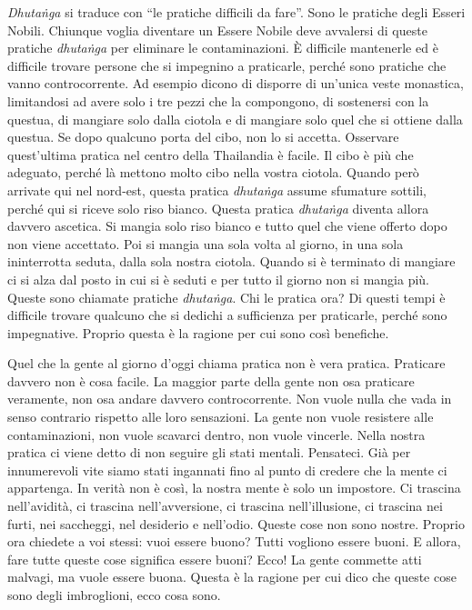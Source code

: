\emph{Dhutaṅga} si traduce con ``le pratiche difficili da fare''. Sono
le pratiche degli Esseri Nobili. Chiunque voglia diventare un Essere
Nobile deve avvalersi di queste pratiche \emph{dhutaṅga} per eliminare
le contaminazioni. È difficile mantenerle ed è difficile trovare persone
che si impegnino a praticarle, perché sono pratiche che vanno
controcorrente. Ad esempio dicono di disporre di un'unica veste
monastica, limitandosi ad avere solo i tre pezzi che la compongono, di
sostenersi con la questua, di mangiare solo dalla ciotola e di mangiare
solo quel che si ottiene dalla questua. Se dopo qualcuno porta del cibo,
non lo si accetta. Osservare quest'ultima pratica nel centro della
Thailandia è facile. Il cibo è più che adeguato, perché là mettono molto
cibo nella vostra ciotola. Quando però arrivate qui nel nord-est, questa
pratica \emph{dhutaṅga} assume sfumature sottili, perché qui si riceve
solo riso bianco. Questa pratica \emph{dhutaṅga} diventa allora davvero
ascetica. Si mangia solo riso bianco e tutto quel che viene offerto dopo
non viene accettato. Poi si mangia una sola volta al giorno, in una sola
ininterrotta seduta, dalla sola nostra ciotola. Quando si è terminato di
mangiare ci si alza dal posto in cui si è seduti e per tutto il giorno
non si mangia più. Queste sono chiamate pratiche \emph{dhutaṅga}. Chi le
pratica ora? Di questi tempi è difficile trovare qualcuno che si dedichi
a sufficienza per praticarle, perché sono impegnative. Proprio questa è
la ragione per cui sono così benefiche.

Quel che la gente al giorno d'oggi chiama pratica non è vera pratica.
Praticare davvero non è cosa facile. La maggior parte della gente non
osa praticare veramente, non osa andare davvero controcorrente. Non
vuole nulla che vada in senso contrario rispetto alle loro sensazioni.
La gente non vuole resistere alle contaminazioni, non vuole scavarci
dentro, non vuole vincerle. Nella nostra pratica ci viene detto di non
seguire gli stati mentali. Pensateci. Già per innumerevoli vite siamo
stati ingannati fino al punto di credere che la mente ci appartenga. In
verità non è così, la nostra mente è solo un impostore. Ci trascina
nell'avidità, ci trascina nell'avversione, ci trascina nell'illusione,
ci trascina nei furti, nei saccheggi, nel desiderio e nell'odio. Queste
cose non sono nostre. Proprio ora chiedete a voi stessi: vuoi essere
buono? Tutti vogliono essere buoni. E allora, fare tutte queste cose
significa essere buoni? Ecco! La gente commette atti malvagi, ma vuole
essere buona. Questa è la ragione per cui dico che queste cose sono
degli imbroglioni, ecco cosa sono.

